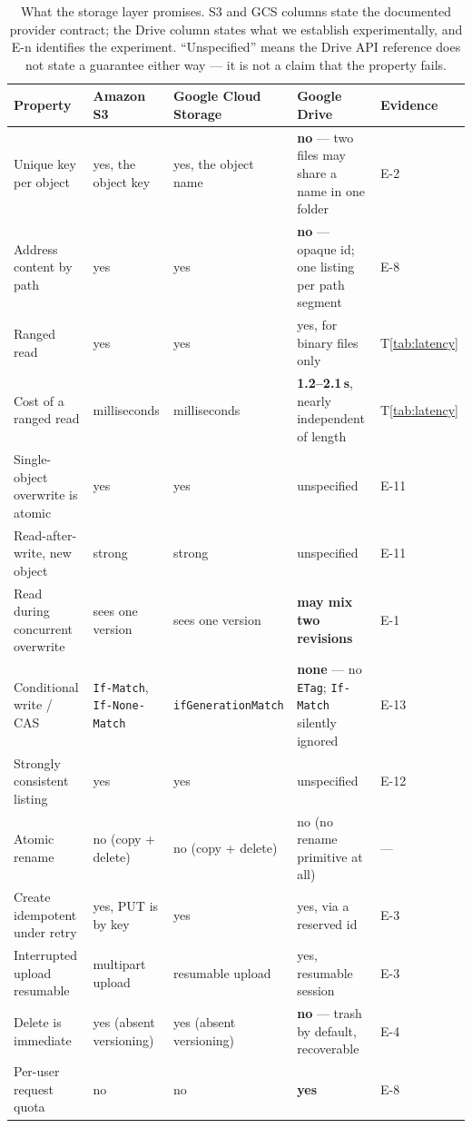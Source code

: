 \documentclass[sigconf, nonacm]{acmart}
\newcommand{\expref}[1]{\textsf{E-#1}}
\begin{document}
\begin{table}[t]
\caption{What the storage layer promises. S3 and GCS columns state the
documented provider contract; the Drive column states what we establish
experimentally, and \expref{n} identifies the experiment. ``Unspecified''
means the Drive API reference does not state a guarantee either way --- it is
not a claim that the property fails.}
\label{tab:guarantees}
\footnotesize
\begin{tabular}{p{}p{}p{}p{}l}
\toprule
Property & Amazon S3 & Google Cloud Storage & Google Drive & Evidence \\
\midrule
Unique key per object      & yes, the object key & yes, the object name & \textbf{no} --- two files may share a name in one folder & \expref{2} \\
Address content by path    & yes & yes & \textbf{no} --- opaque id; one listing per path segment & \expref{8} \\
Ranged read                & yes & yes & yes, for binary files only & T\ref{tab:latency} \\
Cost of a ranged read      & milliseconds & milliseconds & \textbf{1.2--2.1\,s}, nearly independent of length & T\ref{tab:latency} \\
Single-object overwrite is atomic & yes & yes & unspecified & \expref{11} \\
Read-after-write, new object & strong & strong & unspecified & \expref{11} \\
Read during concurrent overwrite & sees one version & sees one version & \textbf{may mix two revisions} & \expref{1} \\
Conditional write / CAS    & \texttt{If-Match}, \texttt{If-None-Match} & \texttt{ifGenerationMatch} & \textbf{none} --- no \texttt{ETag}; \texttt{If-Match} silently ignored & \expref{13} \\
Strongly consistent listing & yes & yes & unspecified & \expref{12} \\
Atomic rename              & no (copy + delete) & no (copy + delete) & no (no rename primitive at all) & --- \\
Create idempotent under retry & yes, PUT is by key & yes & yes, via a reserved id & \expref{3} \\
Interrupted upload resumable & multipart upload & resumable upload & yes, resumable session & \expref{3} \\
Delete is immediate        & yes (absent versioning) & yes (absent versioning) & \textbf{no} --- trash by default, recoverable & \expref{4} \\
Per-user request quota     & no & no & \textbf{yes} & \expref{8} \\
\bottomrule
\end{tabular}
\end{table}
\end{document}
